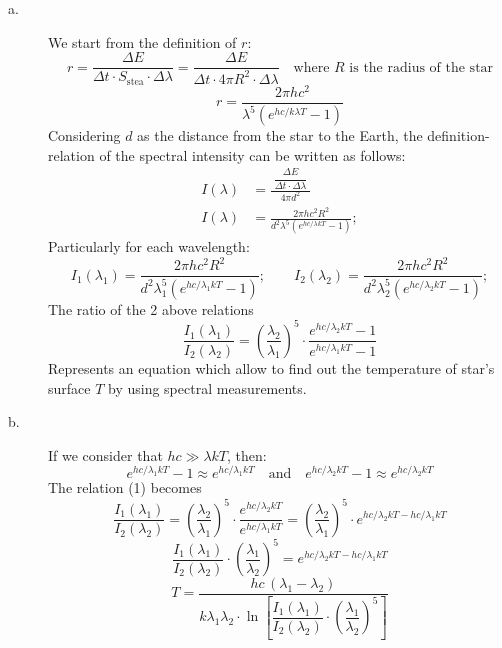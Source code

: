 \begin{description}
\item[a.] We start from the definition of $r$:
\[
r = \frac{\Delta E}{\Delta t \cdot S_{\text{stea}} \cdot \Delta\lambda}
  = \frac{\Delta E}{\Delta t \cdot 4\pi R^2 \cdot \Delta\lambda}
\quad\text{where $R$ is the radius of the star}
\]
\[
r = \frac{2\pi h c^2}{\lambda^5 \left( e^{hc/k\lambda T} - 1 \right)}
\]
Considering $d$ as the distance from the star to the Earth, the
definition-relation of the spectral intensity can be written as follows:
\begin{align*}
I(\lambda) &= \frac{\;\dfrac{\Delta E}{\Delta t \cdot \Delta\lambda}\;}{4\pi d^2}\\
I(\lambda) &= \frac{2\pi h c^2 R^2}
                  {d^2 \lambda^5 \left( e^{hc/\lambda k T} - 1 \right)};
\end{align*}
Particularly for each wavelength:
\[
I_1(\lambda_1) = \frac{2\pi h c^2 R^2}
  {d^2 \lambda_1^5 \left( e^{hc/\lambda_1 k T} - 1 \right)};\qquad
I_2(\lambda_2) = \frac{2\pi h c^2 R^2}
  {d^2 \lambda_2^5 \left( e^{hc/\lambda_2 k T} - 1 \right)};
\]
The ratio of the 2 above relations
\begin{equation*}
\frac{I_1(\lambda_1)}{I_2(\lambda_2)}
  = \left( \frac{\lambda_2}{\lambda_1} \right)^{\!5}
    \cdot \frac{e^{hc/\lambda_2 k T} - 1}{e^{hc/\lambda_1 k T} - 1}
\tag{1}
\end{equation*}
Represents an equation which allow to find out the temperature of star's
surface $T$ by using spectral measurements.

\item[b.] If we consider that $hc \gg \lambda k T$, then:
\[
e^{hc/\lambda_1 k T} - 1 \approx e^{hc/\lambda_1 k T}
\quad\text{and}\quad
e^{hc/\lambda_2 k T} - 1 \approx e^{hc/\lambda_2 k T}
\]
The relation (1) becomes
\[
\frac{I_1(\lambda_1)}{I_2(\lambda_2)}
  = \left( \frac{\lambda_2}{\lambda_1} \right)^{\!5}
    \cdot \frac{e^{hc/\lambda_2 k T}}{e^{hc/\lambda_1 k T}}
  = \left( \frac{\lambda_2}{\lambda_1} \right)^{\!5}
    \cdot e^{hc/\lambda_2 k T - hc/\lambda_1 k T}
\]
\[
\frac{I_1(\lambda_1)}{I_2(\lambda_2)}
  \cdot \left( \frac{\lambda_1}{\lambda_2} \right)^{\!5}
  = e^{hc/\lambda_2 k T - hc/\lambda_1 k T}
\]
\[
T = \frac{hc\,(\lambda_1 - \lambda_2)}
         {k \lambda_1 \lambda_2 \cdot
          \ln\!\left[ \dfrac{I_1(\lambda_1)}{I_2(\lambda_2)}
          \cdot \left( \dfrac{\lambda_1}{\lambda_2} \right)^{\!5} \right]}
\]


\end{description}
